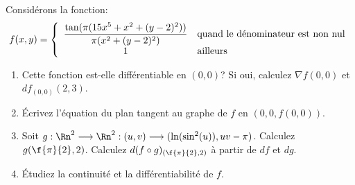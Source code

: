 
\begin{exercice}\label{exo0059}

Considérons la fonction:\[f(x,y)=\left\{\begin{array}{cl}
                        \dfrac{\tan(\pi(15x^5+x^2+(y-2)^2))}{\pi(x^2+(y-2)^2)} & {\rm quand \ le \ d\acute{e}nominateur \ est \ non \ nul}  \\
                        1             						    & {\rm ailleurs}
                        \end{array}\right.\]	
 
 \begin{enumerate}
 \item  Cette fonction est-elle différentiable en $(0,0)$? Si oui, calculez  $\nabla f(0,0)$ et $df_{(0,0)}(2,3)$. 
 
 \item Écrivez l'équation du plan tangent au graphe de $f$ en $(0,0,f(0,0))$.  
 \item Soit $g:\Rn^2\longrightarrow\Rn^2:(u,v)\longrightarrow(\ln(\sin^2(u)),uv-\pi)$. Calculez $g(\f{\pi}{2}, 2)$. Calculez $d(f\circ g)_{(\f{\pi}{2},2)}$ à partir de $df$ et $dg$. 
 
 \item Étudiez la continuité et la différentiabilité de $f$. 
\end{enumerate}

\end{exercice}
